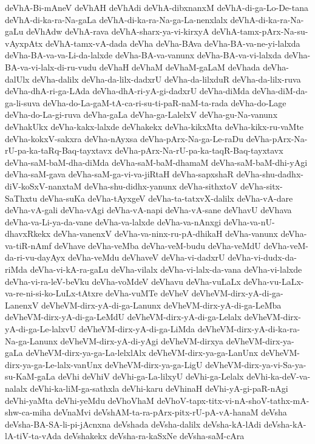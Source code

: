 {deVhA-Bi-mAneV
deVhAH
deVhAdi
deVhA-dibxnanxM
deVhA-di-ga-Lo-De-tana
deVhA-di-ka-ra-Na-gaLa
deVhA-di-ka-ra-Na-ga-La-nenxlalx
deVhA-di-ka-ra-Na-gaLu
deVhAdw
deVhA-rava
deVhA-sharx-ya-vi-kirxyA
deVhA-tamx-pArx-Na-su-vAyxpAtx
deVhA-tamx-vA-dada
deVha
deVha-BAva
deVha-BA-va-ne-yi-lalxda
deVha-BA-va-va-Li-da-lalxde
deVha-BA-va-vanunx
deVha-BA-va-vi-lalxda
deVha-BA-va-vi-lalx-di-ru-vudu
deVhaH
deVhaM
deVhaM-gaLaM
deVhada
deVha-dalUlx
deVha-dalilx
deVha-da-lilx-dadxrU
deVha-da-lilxduR
deVha-da-lilx-ruva
deVha-dhA-ri-ga-LAda
deVha-dhA-ri-yA-gi-dadxrU
deVha-diMda
deVha-diM-da-ga-li-suva
deVha-do-La-gaM-tA-ca-ri-su-ti-paR-naM-ta-rada
deVha-do-Lage
deVha-do-La-gi-ruva
deVha-gaLa
deVha-ga-LalelxV
deVha-gu-Na-vanunx
deVhakUkx
deVha-kakx-lalxde
deVhakekx
deVha-kikxMta
deVha-kikx-ru-vaMte
deVha-kokxV-sakxra
deVha-nAyxsa
deVha-pArx-Na-ga-Le-raDu
deVha-pArx-Na-rU-pa-ka-taRq-Baq-tayxtavx
deVha-pArx-Na-rU-pa-ka-taqR-Baq-tayxtavx
deVha-saM-baM-dha-diMda
deVha-saM-baM-dhamaM
deVha-saM-baM-dhi-yAgi
deVha-saM-gava
deVha-saM-ga-vi-va-jiRtaH
deVha-sapxshaR
deVha-shu-dadhx-diV-koSxV-nanxtaM
deVha-shu-didhx-yanunx
deVha-sithxtoV
deVha-sitx-SaThxtu
deVha-suKa
deVha-tAyxgeV
deVha-ta-tatxvX-dalilx
deVha-vA-dare
deVha-vA-gali
deVha-vAgi
deVha-vA-napi
deVha-vA-sane
deVhavU
deVhava
deVha-va-Li-ya-da-vane
deVha-va-lalxde
deVha-va-nAnxgi
deVha-va-nU-dhavxRkekx
deVha-vanenxV
deVha-va-ninx-ru-pA-dhikaH
deVha-vanunx
deVha-va-tiR-nAmf
deVhave
deVha-veMba
deVha-veM-budu
deVha-veMdU
deVha-veM-da-ri-vu-dayAyx
deVha-veMdu
deVhaveV
deVha-vi-dadxrU
deVha-vi-dudx-da-riMda
deVha-vi-kA-ra-gaLu
deVha-vilalx
deVha-vi-lalx-da-vana
deVha-vi-lalxde
deVha-vi-ra-leV-beVku
deVha-voMdeV
deVhavu
deVha-vuLaLx
deVha-vu-LaLx-va-re-ni-si-ko-LuLx-tAtxre
deVha-vuMTe
deVheV
deVheVM-dirx-yA-di-ga-LanenxV
deVheVM-dirx-yA-di-ga-Lanunx
deVheVM-dirx-yA-di-ga-LeMba
deVheVM-dirx-yA-di-ga-LeMdU
deVheVM-dirx-yA-di-ga-Lelalx
deVheVM-dirx-yA-di-ga-Le-lalxvU
deVheVM-dirx-yA-di-ga-LiMda
deVheVM-dirx-yA-di-ka-ra-Na-ga-Lanunx
deVheVM-dirx-yA-di-yAgi
deVheVM-dirxya
deVheVM-dirx-ya-gaLa
deVheVM-dirx-ya-ga-La-lelxlAlx
deVheVM-dirx-ya-ga-LanUnx
deVheVM-dirx-ya-ga-Le-lalx-vanUnx
deVheVM-dirx-ya-ga-LigU
deVheVM-dirx-ya-vi-Sa-ya-su-KaM-gaLa
deVhi
deVhiV
deVhi-ga-La-lilxyU
deVhi-ga-Lelalx
deVhi-ka-deV-va-nalalx
deVhi-ka-liM-ga-sathxla
deVhi-karu
deVhinaH
deVhi-yA-gi-paR-nAgi
deVhi-yaMta
deVhi-yeMdu
deVhoVhaM
deVhoV-tapx-titx-vi-nA-shoV-tathx-mA-shw-ca-miha
deVnaMvi
deVshAM-ta-ra-pArx-pitx-rU-pA-vA-hanaM
deVsha
deVsha-BA-SA-li-pi-jAcnxna
deVshada
deVsha-dalilx
deVsha-kA-lAdi
deVsha-kA-lA-tiV-ta-vAda
deVshakekx
deVsha-ra-kaSxNe
deVsha-saM-cAra
}

